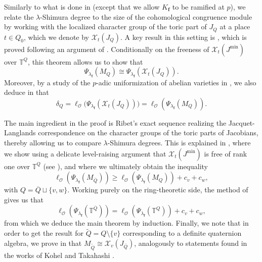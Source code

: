 \documentclass[a4paper, notitlepage, 10pt]{amsart}
\theoremstyle{plain} %
\theoremstyle{definition} %
\theoremstyle{remark} %
\numberwithin{equation}{section}
\newcommand{\bbT}{\mathbb T}
\begin{document}
Similarly to what is done in \cite{Khare03} (except that we allow $K_{\mathbf{f}}$ to be ramified at $p$), we relate the $\lambda$-Shimura degree to the size of the cohomological congruence module by working with the localized character group of the toric part of $J_{Q}$ at a place $t\in Q_0$, which we denote by $\mathcal{X}_t(J_{Q})$. A key result in this setting is , which is proved following an argument of \cite{Helm}. Conditionally on the freeness of $\mathcal{X}_t(J^{\min})$ over $\bbT^Q$, this theorem allows us to show that
$$ \Psi_{\lambda_{\mathbf{f}}}(M_Q)\cong \Psi_{\lambda_{\mathbf{f}}}(\mathcal{X}_t(J_Q)). $$
Moreover, by a study of the $p$-adic uniformization of abelian varieties in , we
also deduce in  that 
$$\delta_Q=\ell_{\mathcal{O}}\big(\Psi_{\lambda_{\mathbf{f}}}(\mathcal{X}_t(J_Q))\big)=\ell_{\mathcal{O}}(\Psi_{\lambda_{\mathbf{f}}}(M_Q)).$$
 
The main ingredient in the proof
is Ribet’s exact sequence realizing the Jacquet-Langlands correspondence on the
character groups of the toric parts of Jacobians, thereby allowing us to compare $\lambda$-Shimura degrees. This is explained in , where we show using a delicate level-raising argument that $\mathcal{X}_t(J^{\min})$ is free of rank one over $\bbT^Q$ (see ), and where we ultimately obtain the inequality
$$\ell_{\mathcal{O}}(\Psi_{\lambda_{\mathbf{f}}}(M_{\overline{Q}}))\ge\ell_{\mathcal{O}}(\Psi_{\lambda_{\mathbf{f}}}(M_Q))+c_{v}+c_{w},$$
with $Q=\overline{Q}\sqcup\{v,w\}$. 
Working purely on the ring-theoretic side, the method of \cite{BKM2} gives us that
$$\ell_{\mathcal{O}}(\Psi_{\lambda_{\mathbf{f}}}(\bbT^{\overline{Q}}))=\ell_{\mathcal{O}}(\Psi_{\lambda_{\mathbf{f}}}(\bbT^Q))+c_{v}+c_{w},$$
from which we deduce the main theorem by induction. Finally, we note that in order to get the result for $\widetilde{Q}= Q\setminus\{v\}$ corresponding to a definite quaternion algebra, we prove
in  that $M_{\widetilde{Q}}\cong \mathcal{X}_v(J_{\overline{Q}})$, analogously to statements found in the works of Kohel \cite{Kohel} and Takahashi \cite{Takahashi}.
\end{document}

